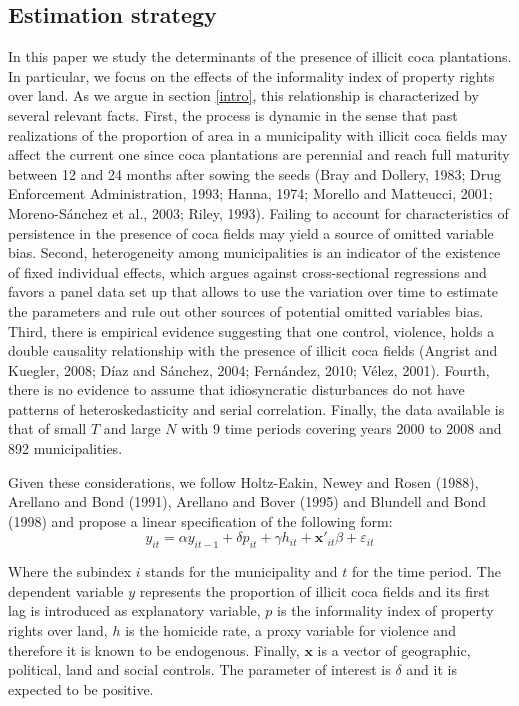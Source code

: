 \documentclass[12pt,a4paper,english]{article}%
\begin{document}
\subsection{Estimation strategy}
\label{strategy}

In this paper we study the determinants of the presence of illicit coca plantations. In particular, we focus on the effects of the informality index of property rights over land. As we argue in section \ref{intro}, this relationship is characterized by several relevant facts. First, the process is dynamic in the sense that past realizations of the proportion of area in a municipality with illicit coca fields may affect the current one since coca plantations are perennial and reach full maturity between 12 and 24 months after sowing the seeds (Bray and Dollery, 1983; Drug Enforcement Administration, 1993; Hanna, 1974; Morello and Matteucci, 2001; Moreno-S\'{a}nchez et al., 2003; Riley, 1993). Failing to account for characteristics of persistence in the presence of coca fields may yield a source of omitted variable bias. Second, heterogeneity among municipalities is an indicator of the existence of fixed individual effects, which argues against cross-sectional regressions and favors a panel data set up that allows to use the variation over time to estimate the parameters and rule out other sources of potential omitted variables bias. Third, there is empirical evidence suggesting that one control, violence, holds a double causality relationship with the presence of illicit coca fields (Angrist and Kuegler, 2008; D\'{i}az and S\'{a}nchez, 2004; Fern\'{a}ndez, 2010; V\'{e}lez, 2001). Fourth, there is no evidence to assume that idiosyncratic disturbances do not have patterns of heteroskedasticity and serial correlation. Finally, the data available is that of small $T$ and large $N$ with 9 time periods covering years 2000 to 2008 and 892 municipalities.

Given these considerations, we follow Holtz-Eakin, Newey and Rosen (1988), Arellano and Bond (1991), Arellano and Bover (1995) and Blundell and Bond (1998) and propose a linear specification of the following form:
\begin{equation}
\label{model}
y_{it}=\alpha y_{it-1}+\delta p_{it} + \gamma h_{it} + \mathbf{x'}_{it}\beta + \varepsilon_{it}
\end{equation}

Where the subindex $i$ stands for the municipality and $t$ for the time period. The dependent variable $y$ represents the proportion of illicit coca fields and its first lag is introduced as explanatory variable, $p$ is the informality index of property rights over land, $h$ is the homicide rate, a proxy variable for violence and therefore it is known to be endogenous. Finally, $\mathbf{x}$ is a vector of geographic, political, land and social controls. The parameter of interest is $\delta$ and it is expected to be positive.
\end{document}
